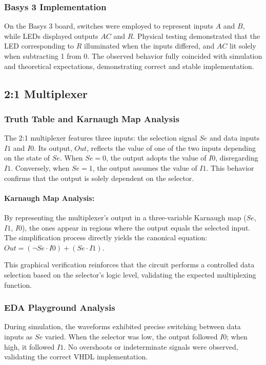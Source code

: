 \documentclass[12pt]{article}  %
\begin{document}
\subsubsection{Basys 3 Implementation}
On the Basys 3 board, switches were employed to represent
inputs $A$ and $B$, while LEDs displayed outputs $AC$ and $R$. Physical testing
demonstrated that the LED corresponding to $R$ illuminated when the inputs
differed, and $AC$ lit solely when subtracting 1 from 0. The observed behavior
fully coincided with simulation and theoretical expectations, demonstrating
correct and stable implementation.

\subsection{2:1 Multiplexer}

\subsubsection{Truth Table and Karnaugh Map Analysis}
The 2:1 multiplexer features three inputs: the selection
signal $Se$ and data inputs $I1$ and $I0$.
Its output, $Out$, reflects the value of one of the two inputs
depending on the state of $Se$. When $Se = 0$, the output adopts the
value of $I0$, disregarding $I1$. Conversely, when $Se = 1$, the output assumes the
value of $I1$. This behavior confirms that the output is solely dependent on the
selector.

\paragraph{Karnaugh Map Analysis:}
By representing the multiplexer’s output in a three-variable Karnaugh map ($Se$,
$I1$, $I0$), the ones appear in regions where the output equals the selected input.
The simplification process directly yields the canonical equation:
$Out = (\neg Se \cdot I0) + (Se \cdot I1)$.

This graphical verification reinforces that the circuit performs a controlled
data selection based on the selector’s logic level, validating the expected
multiplexing function.

\subsubsection{EDA Playground Analysis}
During simulation, the waveforms exhibited precise
switching between data inputs as $Se$ varied. When the selector was low, the
output followed $I0$; when high, it followed $I1$. No overshoots or indeterminate
signals were observed, validating the correct VHDL implementation.
\end{document}
